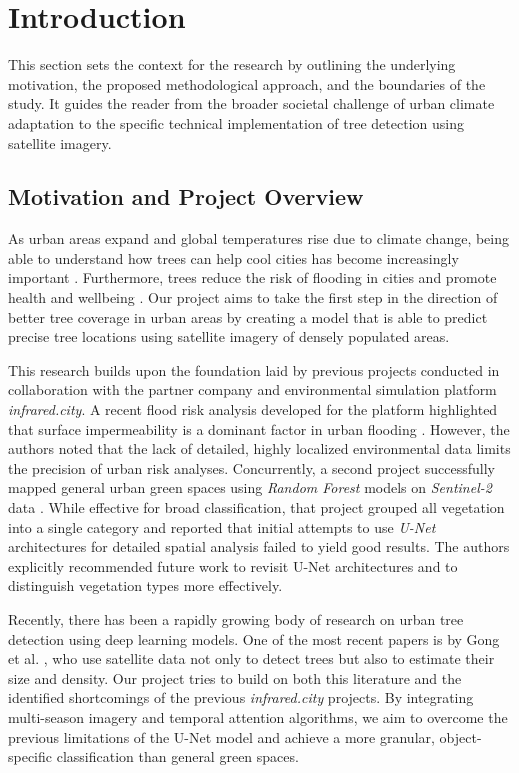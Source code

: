 \section{Introduction}

This section sets the context for the research by outlining the underlying motivation, the proposed methodological approach, and the boundaries of the study. It guides the reader from the broader societal challenge of urban climate adaptation to the specific technical implementation of tree detection using satellite imagery.

\subsection{Motivation and Project Overview}

As urban areas expand and global temperatures rise due to climate change, being able to understand how trees can help cool cities has become increasingly important \cite{eu2023tree}. Furthermore, trees reduce the risk of flooding in cities and promote health and wellbeing \cite{woodlandtrust2023}. Our project aims to take the first step in the direction of better tree coverage in urban areas by creating a model that is able to predict precise tree locations using satellite imagery of densely populated areas.

This research builds upon the foundation laid by previous projects conducted in collaboration with the partner company and environmental simulation platform \textit{infrared.city}. A recent flood risk analysis developed for the platform highlighted that surface impermeability is a dominant factor in urban flooding \cite{marco2026floodrisk}. However, the authors noted that the lack of detailed, highly localized environmental data limits the precision of urban risk analyses. Concurrently, a second project successfully mapped general urban green spaces using \textit{Random Forest} models on \textit{Sentinel-2} data \cite{gotschim2026greenspace}. While effective for broad classification, that project grouped all vegetation into a single category and reported that initial attempts to use \textit{U-Net} architectures for detailed spatial analysis failed to yield good results. The authors explicitly recommended future work to revisit U-Net architectures and to distinguish vegetation types more effectively.

Recently, there has been a rapidly growing body of research on urban tree detection using deep learning models. One of the most recent papers is by Gong et al. \cite{gong2024treedetector}, who use satellite data not only to detect trees but also to estimate their size and density. Our project tries to build on both this literature and the identified shortcomings of the previous \textit{infrared.city} projects. By integrating multi-season imagery and temporal attention algorithms, we aim to overcome the previous limitations of the U-Net model and achieve a more granular, object-specific classification than general green spaces.

